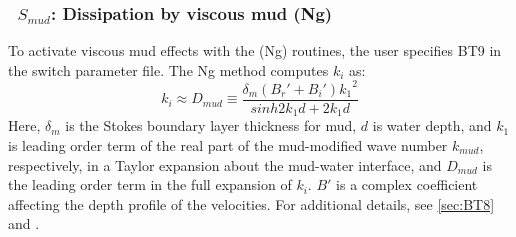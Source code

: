 \vsssub
\subsubsection{~$S_{mud}$: Dissipation by viscous mud (Ng)} \label{sec:BT9}
\vsssub


\noindent
To activate viscous mud effects with the (Ng) routines, the user specifies
{\code BT9} in the switch parameter file. The Ng method computes $k_i$ as:
\begin{equation}\label{eq:dmud3}
  k_i \approx {D_{mud}} \equiv \frac{\delta_m({B_r'}+{B_i'}){k_1}^2}{sinh2{k_1}{d}+2{k_1}{d}}
\end{equation}
Here, ${\delta_m}$ is the Stokes boundary layer thickness for mud, ${d}$ is
water depth, and ${k_1}$ is leading order term of the real part of the
mud-modified wave number $k_{mud}$, respectively, in a Taylor expansion about
the mud-water interface, and ${D_{mud}}$ is the leading order term in the full
expansion of $k_i$. $B'$ is a complex coefficient affecting the depth profile
of the velocities.  For additional details, see \para\ref{sec:BT8} and
\cite{art:Ng00}.
